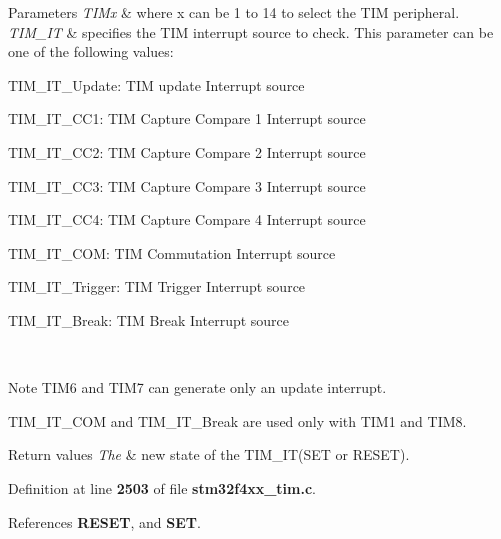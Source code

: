 \begin{DoxyParams}{Parameters}
{\em T\+I\+Mx} & where x can be 1 to 14 to select the T\+IM peripheral. \\
\hline
{\em T\+I\+M\+\_\+\+IT} & specifies the T\+IM interrupt source to check. This parameter can be one of the following values\+: \begin{DoxyItemize}
\item T\+I\+M\+\_\+\+I\+T\+\_\+\+Update\+: T\+IM update Interrupt source \item T\+I\+M\+\_\+\+I\+T\+\_\+\+C\+C1\+: T\+IM Capture Compare 1 Interrupt source \item T\+I\+M\+\_\+\+I\+T\+\_\+\+C\+C2\+: T\+IM Capture Compare 2 Interrupt source \item T\+I\+M\+\_\+\+I\+T\+\_\+\+C\+C3\+: T\+IM Capture Compare 3 Interrupt source \item T\+I\+M\+\_\+\+I\+T\+\_\+\+C\+C4\+: T\+IM Capture Compare 4 Interrupt source \item T\+I\+M\+\_\+\+I\+T\+\_\+\+C\+OM\+: T\+IM Commutation Interrupt source \item T\+I\+M\+\_\+\+I\+T\+\_\+\+Trigger\+: T\+IM Trigger Interrupt source \item T\+I\+M\+\_\+\+I\+T\+\_\+\+Break\+: T\+IM Break Interrupt source\end{DoxyItemize}
\\
\hline
\end{DoxyParams}
\begin{DoxyNote}{Note}
T\+I\+M6 and T\+I\+M7 can generate only an update interrupt. 

T\+I\+M\+\_\+\+I\+T\+\_\+\+C\+OM and T\+I\+M\+\_\+\+I\+T\+\_\+\+Break are used only with T\+I\+M1 and T\+I\+M8.
\end{DoxyNote}

\begin{DoxyRetVals}{Return values}
{\em The} & new state of the T\+I\+M\+\_\+\+I\+T(\+S\+E\+T or R\+E\+S\+E\+T). \\
\hline
\end{DoxyRetVals}


Definition at line \textbf{ 2503} of file \textbf{ stm32f4xx\+\_\+tim.\+c}.



References \textbf{ R\+E\+S\+ET}, and \textbf{ S\+ET}.


